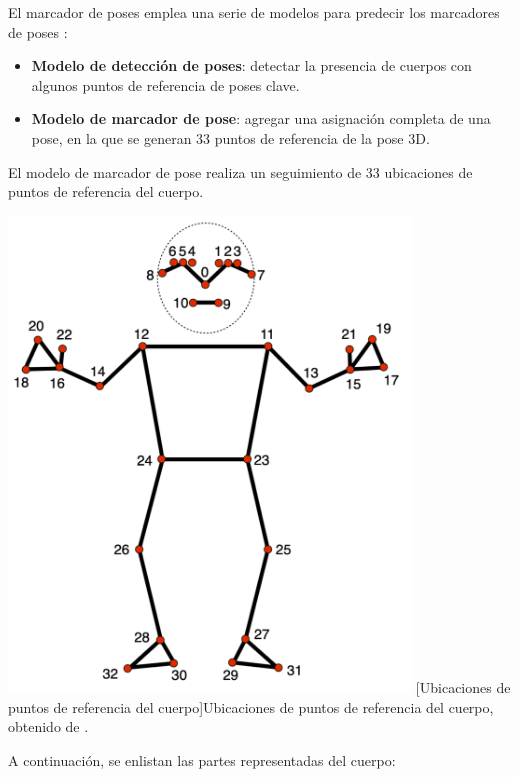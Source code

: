 El marcador de poses emplea una serie de modelos para predecir los marcadores de poses \cite{ref53}:
\begin{itemize}

    \item \textbf{Modelo de detección de poses}: detectar la presencia de cuerpos con algunos puntos de referencia de poses clave.
    \item \textbf{Modelo de marcador de pose}: agregar una asignación completa de una pose, en la que se generan 33 puntos de referencia de la pose 3D.

\end{itemize}
El modelo de marcador de pose realiza un seguimiento de 33 ubicaciones de puntos de referencia del cuerpo.
\begin{center}
    \includegraphics[width=0.8\textwidth]{Images/Cap 2/MediaPipe_Pose.png}
    [Ubicaciones de puntos de referencia del cuerpo]{Ubicaciones de puntos de referencia del cuerpo, obtenido de \cite{ref53}.}  %
\end{center}

A continuación, se enlistan las partes representadas del cuerpo:

